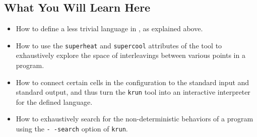 \begin{latexComment}
\section{What You Will Learn Here}

\begin{itemize}
\item How to define a less trivial language in \K, as explained above.
\item How to use the \texttt{superheat} and \texttt{supercool}
attributes of the \K tool to exhaustively explore the space of
interleavings between various points in a program.
\item How to connect certain cells in the configuration to the
standard input and standard output, and thus turn the \texttt{krun}
tool into an interactive interpreter for the defined language.
\item How to exhaustively search for the non-deterministic behaviors
of a program using the \texttt{-\,\!-search} option of \texttt{krun}.
\end{itemize}

\end{latexComment}

\vspace*{3ex}
